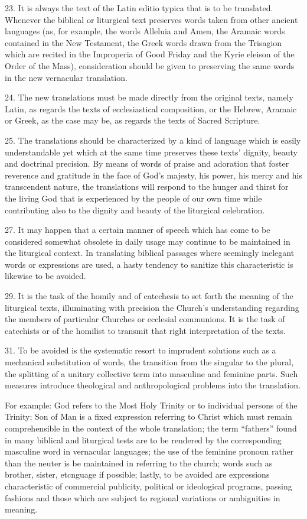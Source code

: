 \documentclass[oneside]{book}
\begin{document}
23. It is always the text of the Latin editio typica that is to be
translated. Whenever the biblical or liturgical text preserves words taken from
other ancient languages (as, for example, the words Alleluia and Amen, the
Aramaic words contained in the New Testament, the Greek words drawn from the
Trisagion which are recited in the Improperia of Good Friday and the Kyrie
eleison of the Order of the Mass), consideration should be given to preserving
the same words in the new vernacular translation.

24. The new translations must be made directly from the original texts, namely
Latin, as regards the texts of ecclesiastical composition, or the Hebrew,
Aramaic or Greek, as the case may be, as regards the texts of Sacred Scripture.

25. The translations should be characterized by a kind of language which is
easily understandable yet which at the same time preserves these texts' dignity,
beauty and doctrinal precision. By means of words of praise and adoration that
foster reverence and gratitude in the face of God's majesty, his power, his
mercy and his transcendent nature, the translations will respond to the hunger
and thirst for the living God that is experienced by the people of our own time
while contributing also to the dignity and beauty of the liturgical celebration.

27. It may happen that a certain manner of speech which has come to be
considered somewhat obsolete in daily usage may continue to be maintained in the
liturgical context. In translating biblical passages where seemingly inelegant
words or expressions are used, a hasty tendency to sanitize this characteristic
is likewise to be avoided.

29. It is the task of the homily and of catechesis to set forth the meaning of
the liturgical texts, illuminating with precision the Church's understanding
regarding the members of particular Churches or ecclesial communions. It is the
task of catechists or of the homilist to transmit that right interpretation of
the texts.

31. To be avoided is the systematic resort to imprudent solutions such as a
mechanical substitution of words, the transition from the singular to the
plural, the splitting of a unitary collective term into masculine and feminine
parts. Such measures introduce theological and anthropological problems into the
translation.

For example: God refers to the Most Holy Trinity or to individual persons of the
Trinity; Son of Man is a fixed expression referring to Christ which must remain
comprehensible in the context of the whole translation; the term ``fathers''
found in many biblical and liturgical tests are to be rendered by the
corresponding masculine word in vernacular languages; the use of the feminine
pronoun rather than the neuter is be maintained in referring to the church;
words such as brother, sister, etcnguage if possible; lastly, to be avoided are
expressions characteristic of commercial publicity, political or ideological
programs, passing fashions and those which are subject to regional variations or
ambiguities in meaning.
\end{document}
